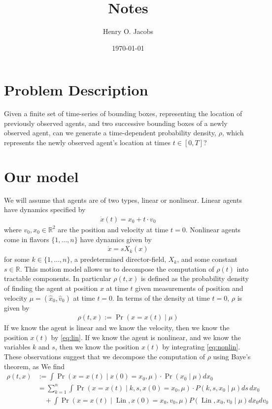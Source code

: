 \documentclass[12pt]{amsart}
\title{Notes}
\author{Henry O. Jacobs}
\date{\today}
\DeclareMathOperator{\Lin}{Lin}
\begin{document}
\maketitle

\section{Problem Description}
Given a finite set of time-series of bounding boxes, representing the location of previously observed agents, and
two successive bounding boxes of a newly observed agent, can we generate a time-dependent probability density, $\rho$, which represents the
newly observed agent's location at times $t \in [0, T]$?

\section{Our model}
We will assume that agents are of two types, linear or nonlinear.  Linear agents have dynamics specified by
\begin{align}
	\dot{x} (t)= x_0 + t \cdot v_0 \label{eq:lin}
\end{align}
where $v_0, x_0 \in \mathbb{R}^2$ are the position and velocity at time $t=0$.
Nonlinear agents come in flavors $\{1,\dots,n\}$ have dynamics given by
\begin{align}
	\dot{x} = s X_k(x) \label{eq:nonlin}
\end{align}
for some $k \in \{1,\dots,n\}$, a predetermined director-field, $X_k$, and some constant $s \in \mathbb{R}$.
This motion model allows us to decompose the computation of $\rho(t)$ into tractable components.
In particular $\rho(t,x)$ is defined as the probability density of finding the agent at position $x$ at time $t$ given measurements of position and velocity $\mu = (\hat{x}_0, \hat{v}_0)$ at time $t=0$.
In terms of the density at time $t=0$, $\rho$ is given by
\begin{align*}
	\rho(t,x ) := \Pr( x = x(t)\mid \mu )
\end{align*}
If we know the agent is linear and we know the velocity, then we know the position $x(t)$ by \eqref{eq:lin}.
If we know the agent is nonlinear, and we know the variables $k$ and $s$, then we know the position $x(t)$ by integrating \eqref{eq:nonlin}.
These observations suggest that we decompose the computation of $\rho$ using Baye's theorem, as
We find
\begin{align*}
	\rho(t,x ) &:= \int \Pr( x = x(t) \mid x(0) = x_0, \mu ) \cdot \Pr(x_0 \mid \mu ) dx_0 \\
	&= \sum_{k=1}^{n} \int \Pr( x = x(t) \mid k,s, x(0) = x_0, \mu ) \cdot P( k,s,x_0 \mid \mu) ds \, dx_0 \\
	&\quad + \int \Pr(x = x(t) \mid \Lin, x(0) = x_0, v_0 , \mu ) P( \Lin, x_0, v_0  \mid \mu ) dx_0 dv_0
\end{align*}
\end{document}
